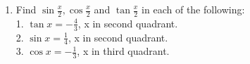 \begin{enumerate}[label=\arabic*.,ref=\thesubsection.\theenumi]
\item Find $\sin\frac{x}{2},\cos\frac{x}{2}$ and $\tan\frac{x}{2}$ in each of the following:\\
1. $\tan x=-\frac{4}{3}$, x in second quadrant. \\
2. $\sin x=\frac{1}{4}$, x in second quadrant.\\
3. $\cos x=-\frac{1}{3}$, x in third quadrant.\\
\end{enumerate}
%
    
